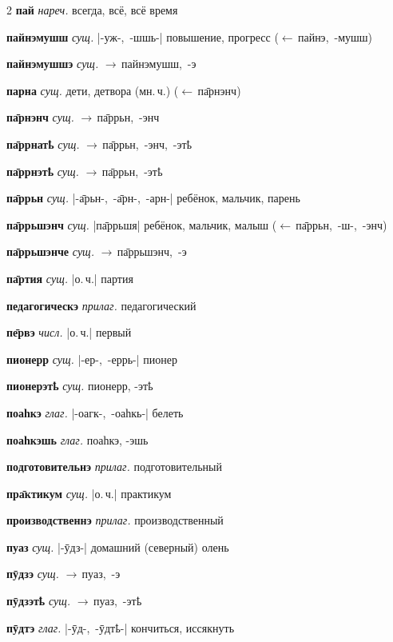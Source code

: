 \documentclass[10pt, a5paper,openany,twoside]{ksdp}
\begin{document}
\begin{multicols}{2}
\textbf{пай} \textit{нареч.} всегда, всё, всё время

\textbf{пайнэмушш} \textit{сущ.} \mbox{|-уж-, -шшь-|} повышение, прогресс \mbox{($\leftarrow$\,пайнэ, -мушш)}

\textbf{пайнэмушшэ} \textit{сущ.} \mbox{$\rightarrow$\,пайнэмушш, -э}

\textbf{парна} \textit{сущ.} дети, детвора (мн.\,ч.) \mbox{($\leftarrow$\,па̄рнэнч)} 

\textbf{па̄рнэнч} \textit{сущ.} \mbox{$\rightarrow$\,па̄ррьн, -энч}

\textbf{па̄ррнатҍ} \textit{сущ.} \mbox{$\rightarrow$\,па̄ррьн, -энч, -этҍ}

\textbf{па̄ррнэтҍ} \textit{сущ.} \mbox{$\rightarrow$\,па̄ррьн, -этҍ}

\textbf{па̄ррьн} \textit{сущ.} \mbox{|-а̄рьн-, -а̄рн-, -арн-|} ребёнок, мальчик, парень

\textbf{па̄ррьшэнч} \textit{сущ.} \mbox{|па̄ррьшя|} ребёнок, мальчик, малыш \mbox{($\leftarrow$\,па̄ррьн, -ш-, -энч)}

\textbf{па̄ррьшэнче} \textit{сущ.} \mbox{$\rightarrow$\,па̄ррьшэнч, -э}

\textbf{па̄ртия} \textit{сущ.} \mbox{|о.\,ч.|} партия

\textbf{педагогическэ} \textit{прилаг.} педагогический

\textbf{пе̄рвэ} \textit{числ.} \mbox{|о.\,ч.|} первый

\textbf{пионерр} \textit{сущ.} \mbox{|-ер-, -еррь-|} пионер

\textbf{пионерэтҍ} \textit{сущ.} пионерр, -этҍ

\textbf{поаһкэ} \textit{глаг.} \mbox{|-оагк-, -оаһкь-|} белеть

\textbf{поаһкэшь} \textit{глаг.} поаһкэ, -эшь

\textbf{подготовительнэ} \textit{прилаг.} подготовительный

\textbf{пра̄ктикум} \textit{сущ.} \mbox{|о.\,ч.|} практикум

\textbf{производственнэ} \textit{прилаг.} производственный

\textbf{пуаз} \textit{сущ.} \mbox{|-ӯдз-|} домашний (северный) олень

\textbf{пӯдзэ} \textit{сущ.} \mbox{$\rightarrow$\,пуаз, -э}

\textbf{пӯдзэтҍ} \textit{сущ.} \mbox{$\rightarrow$\,пуаз, -этҍ}

\textbf{пӯдтэ} \textit{глаг.} \mbox{|-ӯд-, -ӯдтҍ-|} кончиться, иссякнуть


\end{multicols}
\end{document}
